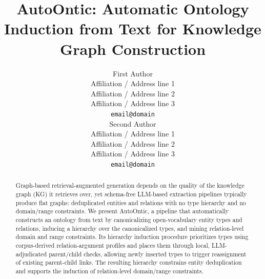 \documentclass[11pt]{article}
\title{AutoOntic: Automatic Ontology Induction from Text for Knowledge Graph Construction}
\author{First Author \\
  Affiliation / Address line 1 \\
  Affiliation / Address line 2 \\
  Affiliation / Address line 3 \\
  \texttt{email@domain} \\\And
  Second Author \\
  Affiliation / Address line 1 \\
  Affiliation / Address line 2 \\
  Affiliation / Address line 3 \\
  \texttt{email@domain} \\}
\begin{document}
\maketitle
\begin{abstract}
Graph-based retrieval-augmented generation depends on the quality of the knowledge graph (KG) it retrieves over, yet schema-free LLM-based extraction pipelines typically produce flat graphs: deduplicated entities and relations with no type hierarchy and no domain/range constraints.
We present AutoOntic, a pipeline that automatically constructs an ontology from text by canonicalizing open-vocabulary entity types and relations, inducing a hierarchy over the canonicalized types, and mining relation-level domain and range constraints. Its hierarchy induction procedure prioritizes types using corpus-derived relation-argument profiles and places them through local, LLM-adjudicated parent/child checks, allowing newly inserted types to trigger reassignment of existing parent-child links. The resulting hierarchy constrains entity deduplication and supports the induction of relation-level domain/range constraints.

\end{abstract}
\end{document}
